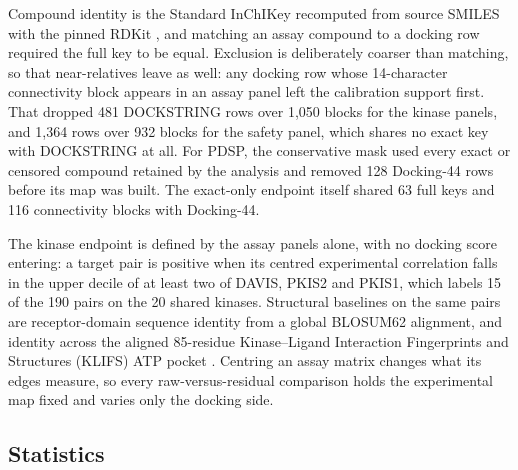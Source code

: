 Compound identity is the Standard InChIKey recomputed from source SMILES with the pinned RDKit
\cite{rdkit2025}, and matching an assay compound to a docking row required the full key to be
equal. Exclusion is deliberately coarser than matching, so that near-relatives leave as well:
any docking row whose 14-character connectivity block appears in an assay panel left the
calibration support first. That dropped 481 DOCKSTRING rows over 1{,}050 blocks for the kinase
panels, and 1{,}364 rows over 932 blocks for the safety panel, which shares no exact key with
DOCKSTRING at all. For PDSP, the conservative mask used every exact or censored compound retained
by the analysis and removed 128 Docking-44 rows before its map was built. The exact-only endpoint
itself shared 63 full keys and 116 connectivity blocks with Docking-44.

The kinase endpoint is defined by the assay panels alone, with no docking score entering: a
target pair is positive when its centred experimental correlation falls in the upper decile of at
least two of DAVIS, PKIS2 and PKIS1, which labels 15 of the 190 pairs on the 20 shared kinases.
Structural baselines on the same pairs are receptor-domain sequence identity from a global
BLOSUM62 alignment, and identity across the aligned 85-residue Kinase--Ligand Interaction
Fingerprints and Structures (KLIFS) ATP pocket \cite{klifs2021}.
Centring an assay matrix changes what its edges measure, so every raw-versus-residual comparison
holds the experimental map fixed and varies only the docking side.

\subsection{Statistics}

